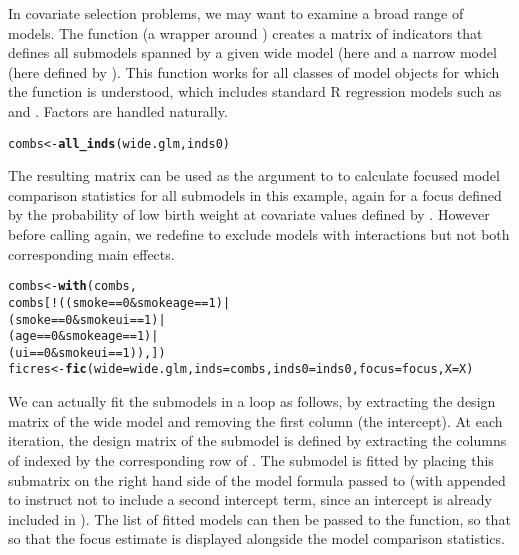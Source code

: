 \documentclass[article,shortnames,nojss,nofooter]{jss}\usepackage[]{graphicx}\usepackage[]{color}
\makeatletter
\newcommand{\hlnum}[1]{\textcolor[rgb]{0.686,0.059,0.569}{#1}}%
\newcommand{\hlopt}[1]{\textcolor[rgb]{0,0,0}{#1}}%
\newcommand{\hlstd}[1]{\textcolor[rgb]{0.345,0.345,0.345}{#1}}%
\newcommand{\hlkwb}[1]{\textcolor[rgb]{0.69,0.353,0.396}{#1}}%
\newcommand{\hlkwc}[1]{\textcolor[rgb]{0.333,0.667,0.333}{#1}}%
\newcommand{\hlkwd}[1]{\textcolor[rgb]{0.737,0.353,0.396}{\textbf{#1}}}%
\newenvironment{kframe}{%
 \def\at@end@of@kframe{}%
 \ifinner\ifhmode%
  \def\at@end@of@kframe{\end{minipage}}%
  \begin{minipage}{\columnwidth}%
 \fi\fi%
 \def\FrameCommand##1{\hskip\@totalleftmargin \hskip-\fboxsep
 \colorbox{shadecolor}{##1}\hskip-\fboxsep
     \hskip-\linewidth \hskip-\@totalleftmargin \hskip\columnwidth}%
 \MakeFramed {\advance\hsize-\width
   \@totalleftmargin\z@ \linewidth\hsize
   \@setminipage}}%
 {\par\unskip\endMakeFramed%
 \at@end@of@kframe}
\newenvironment{knitrout}{}{} %
\makeatother
\begin{document}
In covariate selection problems, we may want to examine a broad range
of models.  The function  (a wrapper around
) creates a matrix of indicators that defines all
submodels spanned by a given wide model (here  and a
narrow model (here defined by ).  This
function works for all classes of model objects  for which the  function is understood, which includes standard R regression models such as  and .  Factors are handled naturally. 
\begin{knitrout}
\color{fgcolor}\begin{kframe}
\begin{alltt}
\hlstd{combs} \hlkwb{<-} \hlkwd{all_inds}\hlstd{(wide.glm, inds0)}
\end{alltt}
\end{kframe}
\end{knitrout}
The resulting matrix can be used as the  argument to
 to calculate focused model comparison statistics for all
submodels in this example, again for a focus defined by the
probability of low birth weight at covariate values defined by
.   However before calling  again, we redefine
 to exclude
models with interactions but not both corresponding main effects. 
\begin{knitrout}
\color{fgcolor}\begin{kframe}
\begin{alltt}
\hlstd{combs} \hlkwb{<-} \hlkwd{with}\hlstd{(combs,}
              \hlstd{combs[}\hlopt{!}\hlstd{((smoke}\hlopt{==}\hlnum{0} \hlopt{&} \hlstd{smokeage}\hlopt{==}\hlnum{1}\hlstd{)} \hlopt{|}
                      \hlstd{(smoke}\hlopt{==}\hlnum{0} \hlopt{&} \hlstd{smokeui}\hlopt{==}\hlnum{1}\hlstd{)} \hlopt{|}
                      \hlstd{(age}\hlopt{==}\hlnum{0} \hlopt{&} \hlstd{smokeage}\hlopt{==}\hlnum{1}\hlstd{)} \hlopt{|}
                      \hlstd{(ui}\hlopt{==}\hlnum{0} \hlopt{&} \hlstd{smokeui}\hlopt{==}\hlnum{1}\hlstd{)),])}
\hlstd{ficres} \hlkwb{<-} \hlkwd{fic}\hlstd{(}\hlkwc{wide}\hlstd{=wide.glm,} \hlkwc{inds}\hlstd{=combs,} \hlkwc{inds0}\hlstd{=inds0,} \hlkwc{focus}\hlstd{=focus,} \hlkwc{X}\hlstd{=X)}
\end{alltt}
\end{kframe}
\end{knitrout}

We can actually fit the submodels in a loop as follows, by extracting
the design matrix  of the wide model and removing the first
column (the intercept).  At each iteration, the
design matrix of the submodel is defined by extracting the columns of
 indexed by the corresponding row of .  The
submodel is fitted by placing this submatrix  on the right hand side of
the model formula passed to  (with  appended to
instruct  not to include a second intercept term, since an
intercept is already included in ).  The list of fitted
models  can then be passed to the  function, so
that so that the focus estimate is displayed alongside the model
comparison statistics. 
\end{document}
